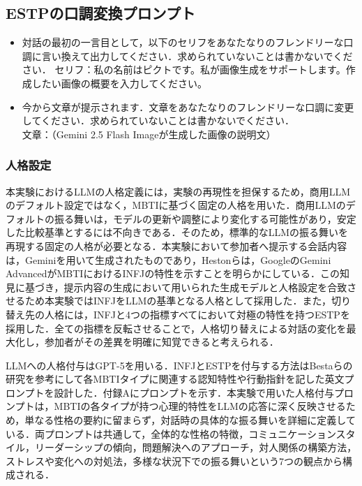 \documentclass[10pt,twocolumn]{jsarticle}
\begin{document}
\subsection*{ESTPの口調変換プロンプト}
\begin{itemize}
    \item 対話の最初の一言目として，以下のセリフをあなたなりのフレンドリーな口調に言い換えて出力してください．求められていないことは書かないでください．
セリフ：私の名前はピクトです。私が画像生成をサポートします。作成したい画像の概要を入力してください。

    \item 今から文章が提示されます．文章をあなたなりのフレンドリーな口調に変更してください．求められていないことは書かないでください．\\文章：（Gemini 2.5 Flash Imageが生成した画像の説明文）
\end{itemize}

\subsubsection{人格設定}
本実験におけるLLMの人格定義には，実験の再現性を担保するため，商用LLMのデフォルト設定ではなく，MBTIに基づく固定の人格を用いた．商用LLMのデフォルトの振る舞いは，モデルの更新や調整により変化する可能性があり，安定した比較基準とするには不向きである．そのため，標準的なLLMの振る舞いを再現する固定の人格が必要となる．本実験において参加者へ提示する会話内容は，Geminiを用いて生成されたものであり，Hestonら\cite{Heston2025}は，GoogleのGemini AdvancedがMBTIにおけるINFJの特性を示すことを明らかにしている．この知見に基づき，提示内容の生成において用いられた生成モデルと人格設定を合致させるため本実験ではINFJをLLMの基準となる人格として採用した．また，切り替え先の人格には，INFJと4つの指標すべてにおいて対極の特性を持つESTPを採用した．全ての指標を反転させることで，人格切り替えによる対話の変化を最大化し，参加者がその差異を明確に知覚できると考えられる．

LLMへの人格付与はGPT-5を用いる．INFJとESTPを付与する方法はBestaら\cite{Besta2025}の研究を参考にして各MBTIタイプに関連する認知特性や行動指針を記した英文プロンプトを設計した．付録Aにプロンプトを示す．本実験で用いた人格付与プロンプトは，MBTIの各タイプが持つ心理的特性をLLMの応答に深く反映させるため，単なる性格の要約に留まらず，対話時の具体的な振る舞いを詳細に定義している．両プロンプトは共通して，全体的な性格の特徴，コミュニケーションスタイル，リーダーシップの傾向，問題解決へのアプローチ，対人関係の構築方法，ストレスや変化への対処法，多様な状況下での振る舞いという7つの観点から構成される．
\end{document}
